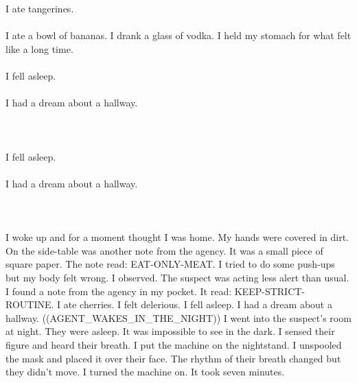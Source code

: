 \documentclass{article}
\begin{document}
    \section{}
    I ate tangerines.\\\\I ate a bowl of bananas. I drank a glass of vodka. I held my stomach for what felt like a long time.\\\\I fell asleep.\\\\I had a dream about a hallway.\\\\ 
    \newpage
    
    \section{}
    I fell asleep.\\\\I had a dream about a hallway.\\\\ 
    \newpage
    
    \section{}
    I woke up and for a moment thought I was home. My hands were covered in dirt. On the side-table was another note from the agency. It was a small piece of square paper. The note read: EAT-ONLY-MEAT. I tried to do some push-ups but my body felt wrong. I observed. The suspect was acting less alert than usual. I found a note from the agency in my pocket. It read: KEEP-STRICT-ROUTINE. I ate cherries. I felt delerious. I fell asleep. I had a dream about a hallway. ((AGENT_WAKES_IN_THE_NIGHT)) I went into the suspect's room at night. They were asleep. It was impossible to see in the dark. I sensed their figure and heard their breath. I put the machine on the nightstand. I unspooled the mask and placed it over their face. The rhythm of their breath changed but they didn't move. I turned the machine on. It took seven minutes. \\\\
    \newpage
    
\end{document}
